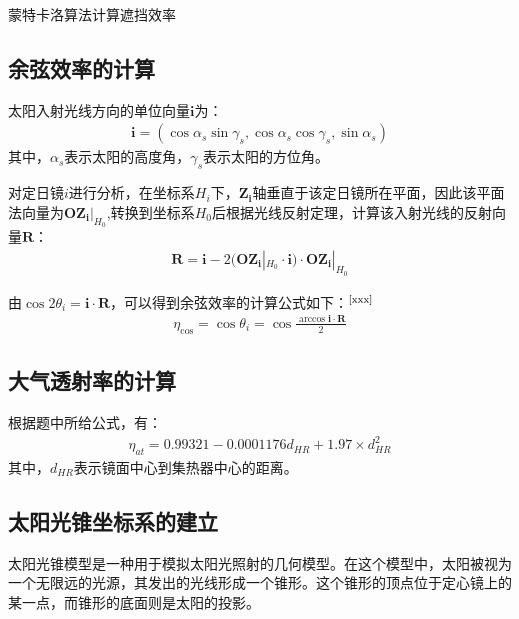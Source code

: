 \documentclass[withoutpreface,bwprint]{cumcmthesis} %
\begin{document}
\begin{algorithm}[H]
\normalem
  \SetAlgoLined
  \caption{蒙特卡洛算法计算遮挡效率}
 \end{algorithm}

\subsection{余弦效率的计算}
太阳入射光线方向的单位向量$\mathbf{i}$为：
\begin{eqnarray}
\mathbf{i}=(\cos \alpha_s\sin\gamma_s,\cos\alpha_s\cos\gamma_s,\sin\alpha_s)
\end{eqnarray}
其中，$\alpha_s$表示太阳的高度角，$\gamma_s$表示太阳的方位角。

对定日镜$i$进行分析，在坐标系$H_i$下，$\mathbf{Z_i}$轴垂直于该定日镜所在平面，因此该平面法向量为$\mathbf{OZ_i}|_{H_0}$,转换到坐标系$H_0$后根据光线反射定理，计算该入射光线的反射向量$\mathbf{R}$：
\begin{eqnarray}
\mathbf{R}=\mathbf{i}-2(\mathbf{OZ_i}|_{H_0}\cdot \mathbf{i})\cdot \mathbf{OZ_i}|_{H_0}
\end{eqnarray}

由$\cos2\theta_i=\mathbf{i}\cdot \mathbf{R}$，可以得到余弦效率的计算公式如下：$^\text{\cite{xxx}}$
\begin{eqnarray}
\eta_{\cos}=\cos\theta_i=\cos\frac{\arccos \mathbf{i}\cdot\mathbf{R}}{2}
\end{eqnarray}

\subsection{大气透射率的计算}
根据题中所给公式，有：
\begin{eqnarray}
\eta_{at}=0.99321-0.0001176d_{HR}+1.97\times d_{HR}^2
\end{eqnarray}
其中，$d_{HR}$表示镜面中心到集热器中心的距离。
\subsection*{太阳光锥坐标系的建立}
太阳光锥模型是一种用于模拟太阳光照射的几何模型。在这个模型中，太阳被视为一个无限远的光源，其发出的光线形成一个锥形。这个锥形的顶点位于定心镜上的某一点，而锥形的底面则是太阳的投影。
\end{document}
